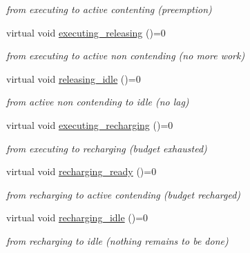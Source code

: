 \begin{DoxyCompactItemize}
\begin{DoxyCompactList}\small\item\em from executing to active contenting (preemption) \end{DoxyCompactList}\item 
virtual void \hyperlink{classRTSim_1_1Server_a789fd7dc0b855eb54fe370858807e848}{executing\+\_\+releasing} ()=0\hypertarget{classRTSim_1_1Server_a789fd7dc0b855eb54fe370858807e848}{}\label{classRTSim_1_1Server_a789fd7dc0b855eb54fe370858807e848}

\begin{DoxyCompactList}\small\item\em from executing to active non contending (no more work) \end{DoxyCompactList}\item 
virtual void \hyperlink{classRTSim_1_1Server_a444456a594fee87808f1a78b5b250687}{releasing\+\_\+idle} ()=0\hypertarget{classRTSim_1_1Server_a444456a594fee87808f1a78b5b250687}{}\label{classRTSim_1_1Server_a444456a594fee87808f1a78b5b250687}

\begin{DoxyCompactList}\small\item\em from active non contending to idle (no lag) \end{DoxyCompactList}\item 
virtual void \hyperlink{classRTSim_1_1Server_aa97cf6596f10cc1f9e3b001cb4fafba0}{executing\+\_\+recharging} ()=0\hypertarget{classRTSim_1_1Server_aa97cf6596f10cc1f9e3b001cb4fafba0}{}\label{classRTSim_1_1Server_aa97cf6596f10cc1f9e3b001cb4fafba0}

\begin{DoxyCompactList}\small\item\em from executing to recharging (budget exhausted) \end{DoxyCompactList}\item 
virtual void \hyperlink{classRTSim_1_1Server_ab56064dee1eb3c11249f41d63c9f8e9f}{recharging\+\_\+ready} ()=0\hypertarget{classRTSim_1_1Server_ab56064dee1eb3c11249f41d63c9f8e9f}{}\label{classRTSim_1_1Server_ab56064dee1eb3c11249f41d63c9f8e9f}

\begin{DoxyCompactList}\small\item\em from recharging to active contending (budget recharged) \end{DoxyCompactList}\item 
virtual void \hyperlink{classRTSim_1_1Server_a09c4c92b5279d574b0262c47f9110af7}{recharging\+\_\+idle} ()=0\hypertarget{classRTSim_1_1Server_a09c4c92b5279d574b0262c47f9110af7}{}\label{classRTSim_1_1Server_a09c4c92b5279d574b0262c47f9110af7}

\begin{DoxyCompactList}\small\item\em from recharging to idle (nothing remains to be done) \end{DoxyCompactList}\end{DoxyCompactItemize}
